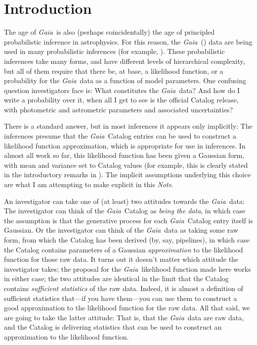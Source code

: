 \documentclass[12pt, modern]{aastex62h}
\newcommand{\Gaia}{\textsl{Gaia}}
\newcommand{\documentname}{\textsl{Note}}
\begin{document}
\section{Introduction}
The age of \Gaia\ is also (perhaps coincidentally) the age of principled
probabilistic inference in astrophysics.
For this reason, the \Gaia\ (\citealt{gaia}) data are being used in many probabilistic
inferences (for example, \citealt{tri3, hawkins, sesar, lin}).
These probabilistic inferences take many forms, and have different levels
of hierarchical complexity, but all of them require that there be, at base,
a likelihood function, or a probability for the \Gaia\ data as a function
of model parameters.
One confusing question investigators face is: What constitutes the \Gaia\ data?
And how do I write a probability over it, when all I get to see is the
official Catalog release, with photometric and astrometric parameters and associated
uncertainties?

There is a standard answer, but in most inferences it appears only implicitly:
The inferences presume that the \Gaia\ Catalog entries can be used to construct
a likelihood function approximation, which is appropriate for use in inferences.
In almost all work so far, this likelihood function has been given a Gaussian form,
with mean and variance set to Catalog values (for example, this is clearly
stated in the introductory remarks in \citealt{tri2}).
The implicit assumptions underlying this choice are
what I am attempting to make explicit in this \documentname.

An investigator can take one of (at least) two attitudes towards the \Gaia\ data:
The investigator can think of the \Gaia\ Catalog as \emph{being the data}, in which case
the assumption is that the generative process for each \Gaia\ Catalog entry
itself is Gaussian.
Or the investigator can think of the \Gaia\ data as taking some raw form,
from which the Catalog has been derived (by, say, pipelines),
in which case the Catalog contains parameters of a Gaussian
\emph{approximation} to the likelihood function for those raw data.
It turns out it doesn't matter which attitude the investigator takes; the
proposal for the \Gaia\ likelihood function made here works in either case;
the two attitudes are identical in the limit that the Catalog contains
\emph{sufficient statistics} of the raw data.
Indeed, it is almost a definition of sufficient statistics that---if you have them---you
can use them to construct a good approximation to the likelihood function for the
raw data.
All that said, we are going to take the latter attitude: That is, that the
\Gaia\ data are raw data, and the Catalog is delivering statistics that can
be used to construct an approximation to the likelihood function.
\end{document}
